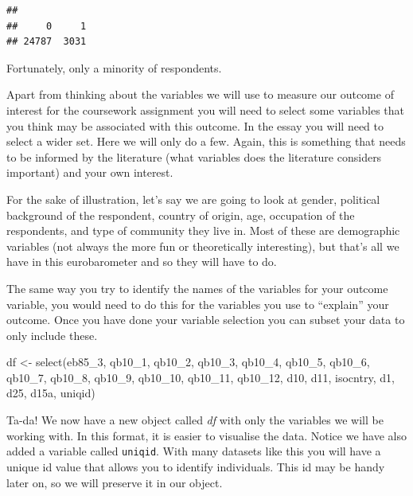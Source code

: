 \documentclass[
]{book}
\newenvironment{Shaded}{\begin{snugshade}}{\end{snugshade}}
\newcommand{\FunctionTok}[1]{\textcolor[rgb]{0.00,0.00,0.00}{#1}}
\newcommand{\NormalTok}[1]{#1}
\newcommand{\OtherTok}[1]{\textcolor[rgb]{0.56,0.35,0.01}{#1}}
\newcommand{\SpecialCharTok}[1]{\textcolor[rgb]{0.00,0.00,0.00}{#1}}
\begin{document}
\begin{Shaded}
\end{Shaded}

\begin{verbatim}
## 
##     0     1 
## 24787  3031
\end{verbatim}

Fortunately, only a minority of respondents.

Apart from thinking about the variables we will use to measure our outcome of interest for the coursework assignment you will need to select some variables that you think may be associated with this outcome. In the essay you will need to select a wider set. Here we will only do a few. Again, this is something that needs to be informed by the literature (what variables does the literature considers important) and your own interest.

For the sake of illustration, let's say we are going to look at gender, political background of the respondent, country of origin, age, occupation of the respondents, and type of community they live in. Most of these are demographic variables (not always the more fun or theoretically interesting), but that's all we have in this eurobarometer and so they will have to do.

The same way you try to identify the names of the variables for your outcome variable, you would need to do this for the variables you use to ``explain'' your outcome. Once you have done your variable selection you can subset your data to only include these.

\begin{Shaded}
\begin{Highlighting}[]
\NormalTok{df }\OtherTok{\textless{}{-}} \FunctionTok{select}\NormalTok{(eb85\_3, qb10\_1, qb10\_2, qb10\_3, qb10\_4,}
\NormalTok{             qb10\_5, qb10\_6, qb10\_7, qb10\_8, qb10\_9,}
\NormalTok{             qb10\_10, qb10\_11, qb10\_12, d10, d11,}
\NormalTok{             isocntry, d1, d25, d15a, uniqid)}
\end{Highlighting}
\end{Shaded}

Ta-da! We now have a new object called \emph{df} with only the variables we will be working with. In this format, it is easier to visualise the data. Notice we have also added a variable called \texttt{uniqid}. With many datasets like this you will have a unique id value that allows you to identify individuals. This id may be handy later on, so we will preserve it in our object.
\end{document}
